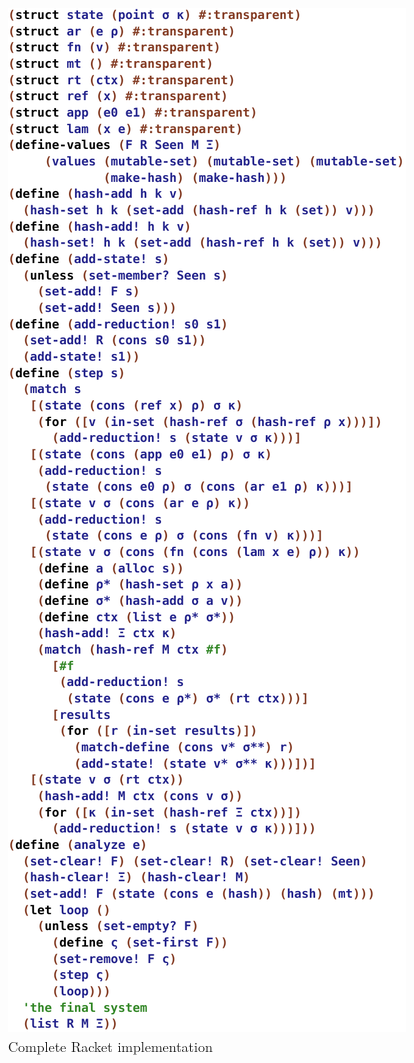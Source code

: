 \begin{figure}
  \includegraphics[scale=0.8]{impl}
  \caption{Complete Racket implementation}
\label{fig:real-impl}
\end{figure}

